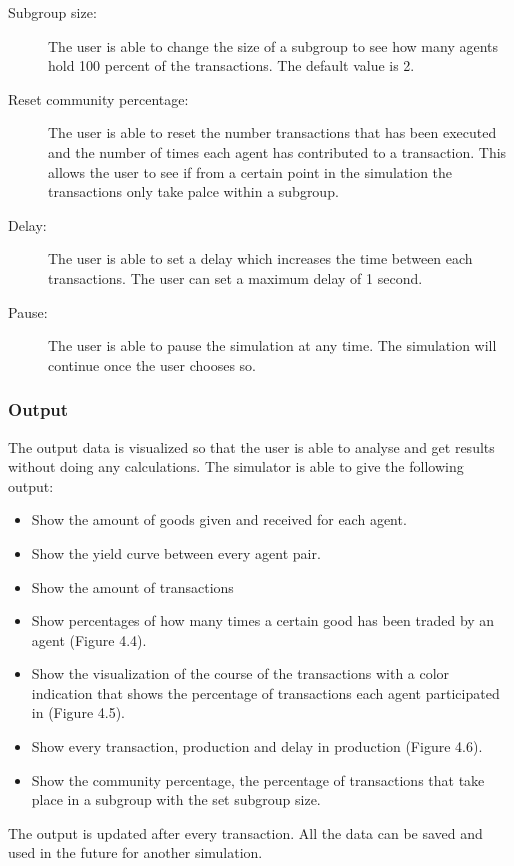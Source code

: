 \documentclass[twoside,openright]{uva-bachelor-thesis}
\begin{document}
\begin{description}
  \item[Subgroup size:] The user is able to change the size of a subgroup to see how many agents hold 100 percent of the transactions. The default value is 2.
  \item[Reset community percentage:] The user is able to reset the number transactions that has been executed and the number of times each agent has contributed to a transaction. This allows the user to see if from a certain point in the simulation the transactions only take palce within a subgroup.
  \item[Delay:] The user is able to set a delay which increases the time between each transactions. The user can set a maximum delay of 1 second. 
  \item[Pause:] The user is able to pause the simulation at any time. The simulation will continue once the user chooses so.
\end{description}


\subsubsection{Output}
The output data is visualized so that the user is able to analyse and get results without doing any calculations. The simulator is able to give the following output:
\begin{itemize}
  \item Show the amount of goods given and received for each agent.
  \item Show the yield curve between every agent pair.
  \item Show the amount of transactions
  \item Show percentages of how many times a certain good has been traded by an agent (Figure 4.4).
  \item Show the visualization of the course of the transactions with a color indication that shows the percentage of transactions each agent participated in (Figure 4.5). 
  \item Show every transaction, production and delay in production (Figure 4.6).
  \item Show the community percentage, the percentage of transactions that take place in a subgroup with the set subgroup size.
\end{itemize}

The output is updated after every transaction. All the data can be saved and used in the future for another simulation.
\end{document}
